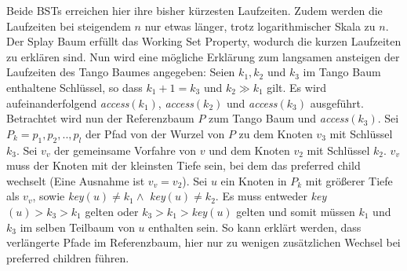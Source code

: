 \documentclass[a4paper,12pt]{article}
\begin{document}
\noindent Beide BSTs erreichen hier ihre bisher kürzesten Laufzeiten. Zudem werden die Laufzeiten  bei steigendem $n$ nur etwas länger, trotz logarithmischer Skala zu $n$. Der Splay Baum erfüllt das Working Set Property, wodurch die kurzen Laufzeiten zu erklären sind. Nun wird eine mögliche Erklärung zum langsamen ansteigen der Laufzeiten des Tango Baumes angegeben: Seien $k_1, k_2$ und $k_3$ im Tango Baum enthaltene Schlüssel, so dass $k_1 + 1 = k_3$ und $k_2 \gg k_1$ gilt. Es wird aufeinanderfolgend \textit{access}$\left(k_1\right)$, \textit{access}$\left(k_2\right)$ und \textit{access}$\left(k_3\right)$ ausgeführt. Betrachtet wird nun der Referenzbaum $P$ zum Tango Baum und \textit{access}$\left(k_3\right)$. Sei $P_k = p_1, p_2,.., p_l$ der Pfad von der Wurzel von $P$ zu dem Knoten $v_3$ mit Schlüssel $k_3$. Sei $v_v$ der gemeinsame Vorfahre von $v$ und dem Knoten $v_2$ mit Schlüssel $k_2$. $v_v$ muss der Knoten mit der kleinsten Tiefe sein, bei dem das preferred child wechselt (Eine Ausnahme ist $v_v = v_2$). Sei $u$ ein Knoten in $P_k$ mit größerer Tiefe als $v_v$, sowie \textit{key}$\left(u\right) \neq k_1 \wedge $ \textit{key}$\left(u \right)\neq k_2 $. Es muss entweder \textit{key}$\left(u\right) > k_3 > k_1$ gelten oder  $ k_3 > k_1 >$\textit{key}$\left(u\right)$ gelten und somit müssen $k_1$ und $k_3$ im selben Teilbaum von $u$ enthalten sein. So kann erklärt werden, dass verlängerte Pfade im Referenzbaum, hier nur zu wenigen zusätzlichen Wechsel bei preferred children führen. \\  
\end{document}
